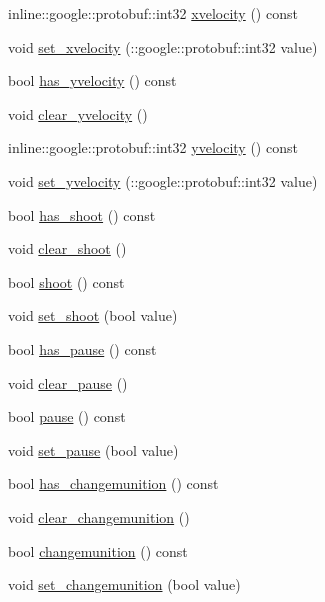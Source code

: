 \begin{DoxyCompactItemize}
\item 
inline\-::google\-::protobuf\-::int32 \hyperlink{class_control_player_aa4ae47b09a2afa53a42520d676509af9}{xvelocity} () const 
\item 
void \hyperlink{class_control_player_a4ad42d15731a8d10bd818631268a0c34}{set\-\_\-xvelocity} (\-::google\-::protobuf\-::int32 value)
\item 
bool \hyperlink{class_control_player_ad5d47c980b16fa21b4a1e03289f8e219}{has\-\_\-yvelocity} () const 
\item 
void \hyperlink{class_control_player_a939a11128c7ed1dfaead4df0795744c8}{clear\-\_\-yvelocity} ()
\item 
inline\-::google\-::protobuf\-::int32 \hyperlink{class_control_player_a7a039c8d2f85af678def3327245d3d80}{yvelocity} () const 
\item 
void \hyperlink{class_control_player_a901e221ed999443269b1e5495716ff68}{set\-\_\-yvelocity} (\-::google\-::protobuf\-::int32 value)
\item 
bool \hyperlink{class_control_player_a3d6e80ba43b0603ecdbd762f74810bab}{has\-\_\-shoot} () const 
\item 
void \hyperlink{class_control_player_a1cf53b17bf67474479aa8444df4ad867}{clear\-\_\-shoot} ()
\item 
bool \hyperlink{class_control_player_a6f14f0e60e6bc7f736f16502a5a7025e}{shoot} () const 
\item 
void \hyperlink{class_control_player_ad26250cc76bd9016bb9136535ea27e5b}{set\-\_\-shoot} (bool value)
\item 
bool \hyperlink{class_control_player_a431c723d3d093f961c651fb7947e99c4}{has\-\_\-pause} () const 
\item 
void \hyperlink{class_control_player_af84ad71ae32b4fa43a1f6263e28783aa}{clear\-\_\-pause} ()
\item 
bool \hyperlink{class_control_player_a549f93f53e0775162cc5d0d5d2cb1da8}{pause} () const 
\item 
void \hyperlink{class_control_player_a1c8b853b906342b1c1b9ce15add0721d}{set\-\_\-pause} (bool value)
\item 
bool \hyperlink{class_control_player_a106aabf9080b2b4f0cb394c7eaa0cd2a}{has\-\_\-changemunition} () const 
\item 
void \hyperlink{class_control_player_a4a1f53c88470a7ac2978a3575d5e92d5}{clear\-\_\-changemunition} ()
\item 
bool \hyperlink{class_control_player_a0010c94deab35537f06b77bb4a7ebc18}{changemunition} () const 
\item 
void \hyperlink{class_control_player_ab22d1f02d208e63cd9a4bcfa20de3562}{set\-\_\-changemunition} (bool value)
\end{DoxyCompactItemize}
